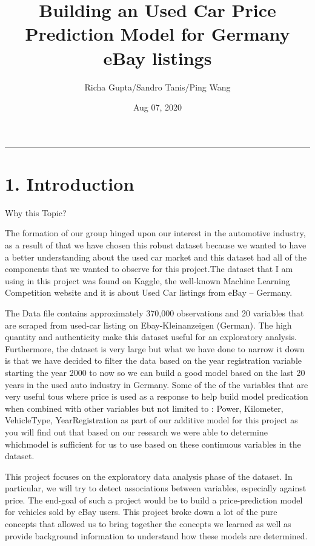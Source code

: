 \documentclass[]{article}
\title{Building an Used Car Price Prediction Model for Germany eBay listings}
\author{Richa Gupta/Sandro Tanis/Ping Wang}
\date{Aug 07, 2020}
\begin{document}
\maketitle

\begin{center}\rule{0.5\linewidth}{\linethickness}\end{center}

\hypertarget{introduction}{%
\section{1. Introduction}\label{introduction}}

Why this Topic?

The formation of our group hinged upon our interest in the automotive
industry, as a result of that we have chosen this robust dataset because
we wanted to have a better understanding about the used car market and
this dataset had all of the components that we wanted to observe for
this project.The dataset that I am using in this project was found on
Kaggle, the well-known Machine Learning Competition website and it is
about Used Car listings from eBay -- Germany.

The Data file contains approximately 370,000 observations and 20
variables that are scraped from used-car listing on Ebay-Kleinanzeigen
(German). The high quantity and authenticity make this dataset useful
for an exploratory analysis. Furthermore, the dataset is very large but
what we have done to narrow it down is that we have decided to filter
the data based on the year registration variable starting the year 2000
to now so we can build a good model based on the last 20 years in the
used auto industry in Germany. Some of the of the variables that are
very useful tous where price is used as a response to help build model
predication when combined with other variables but not limited to :
Power, Kilometer, VehicleType, YearRegistration as part of our additive
model for this project as you will find out that based on our research
we were able to determine whichmodel is sufficient for us to use based
on these continuous variables in the dataset.

This project focuses on the exploratory data analysis phase of the
dataset. In particular, we will try to detect associations between
variables, especially against price. The end-goal of such a project
would be to build a price-prediction model for vehicles sold by eBay
users. This project broke down a lot of the pure concepts that allowed
us to bring together the concepts we learned as well as provide
background information to understand how these models are determined.
\end{document}
